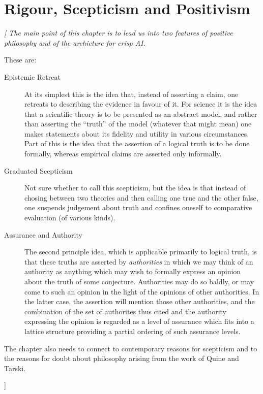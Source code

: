 
\chapter{Rigour, Scepticism and Positivism}\label{RigourSkepticismAndPositivism}

{\it[
The main point of this chapter is to lead us into two features of
positive philosophy and of the archicture for crisp AI.

These are:
\begin{description}
\item[Epistemic Retreat]
At its simplest this is the idea that, instead of asserting a claim,
one retreats to describing the evidence in favour of it.
For science it is the idea that a scientific theory is to be presented
as an abstract model, and rather than asserting the ``truth'' of the
model (whatever that might mean) one makes statements about its
fidelity and utility in various circumstances.
Part of this is the idea that the assertion of a logical truth is to
be done formally, whereas empirical claims are asserted only
informally.
\item[Graduated Scepticism]
Not sure whether to call this scepticism, but the idea is that instead
of chosing between two theories and then calling one true and the
other false, one suspends judgement about truth and confines oneself
to comparative evaluation (of various kinds).
\item[Assurance and Authority]
The second principle idea, which is applicable primarily to logical
truth, is that these truths are asserted by \emph{authorities} in
which we may think of an authority as anything which may wish to
formally express an opinion about the truth of some conjecture.
Authorities may do so baldly, or may come to such an opinion in the
light of the opinions of other authorities.
In the latter case, the assertion will mention those other
authorities, and the combination of the set of authorites thus cited
and the authority expressing the opinion is regarded as a level of
assurance which fits into a lattice structure providing a partial
ordering of such assurance levels.
\end{description}

The chapter also needs to connect to contemporary reasons for
scepticism and to the reasons for doubt about philosophy arising from
the work of Quine and Tarski.

]}


